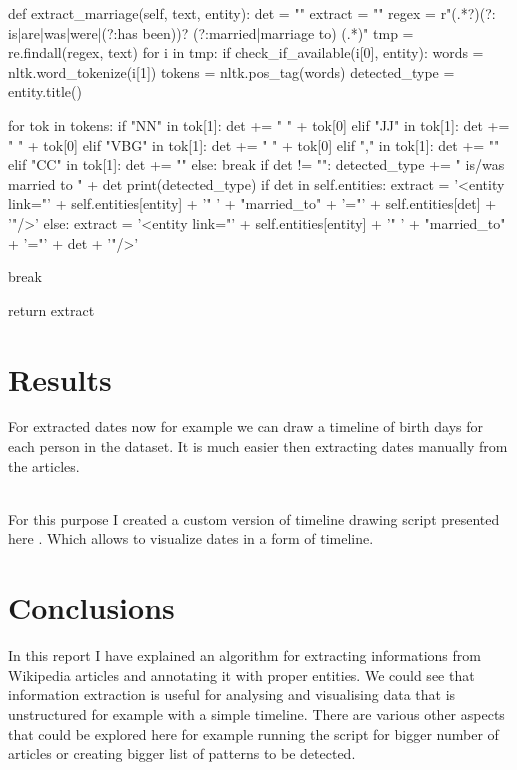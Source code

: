 \documentclass[a4paper]{article}
\begin{document}
\begin{python}
    def extract_marriage(self, text, entity):
        det = ""
        extract = ""
        regex = r"(.*?)(?: is|are|was|were|(?:has been))? (?:married|marriage to) (.*)"
        tmp = re.findall(regex, text)
        for i in tmp:
            if check_if_available(i[0], entity):
                words = nltk.word_tokenize(i[1])
                tokens = nltk.pos_tag(words)
                detected_type = entity.title()

                for tok in tokens:
                    if "NN" in tok[1]:
                        det += " " + tok[0]
                    elif "JJ" in tok[1]:
                        det += " " + tok[0]
                    elif "VBG" in tok[1]:
                        det += " " + tok[0]
                    elif "," in tok[1]:
                        det += ""
                    elif "CC" in tok[1]:
                         det += ""
                    else:
                        break
                if det != "":
                    detected_type += " is/was married to " + det
                    print(detected_type)
                    if det in self.entities:
                        extract = '<entity link="' + self.entities[entity] + '" ' + "married_to" + '="' + self.entities[det] + '"/>'
                    else:
                        extract = '<entity link="' + self.entities[entity] + '" ' + "married_to" + '="' + det + '"/>'

            break

        return extract

\end{python}



\section{Results}
For extracted dates now for example we can draw a timeline of birth days for each person in the dataset. It is much easier then extracting dates manually from the articles.

 \\

For this purpose I created a custom version of timeline drawing script presented here \cite{timeline}. Which allows to visualize dates in a form of timeline.

\section{Conclusions}

In this report I have explained an algorithm for extracting informations from Wikipedia articles and annotating it with proper entities.
We could see that information extraction is useful for analysing and visualising data that is unstructured for example with a simple timeline.
There are various other aspects that could be explored here for example running the script for bigger number of articles or creating bigger list of patterns to be detected.



\end{document}
